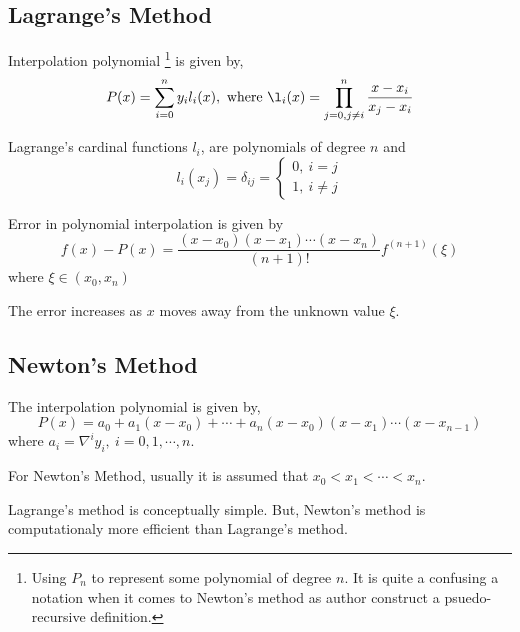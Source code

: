 \subsection{Lagrange's Method}
Interpolation polynomial
\footnote{
	Using $P_n$ to represent some polynomial of degree $n$.
	It is quite a confusing a notation when it comes to Newton's method as author construct a psuedo-recursive definition.
	}
	is given by,
\begin{equation}
	P(x) = \sum_{i=0}^n y_i l_i(x),\text{ where } \l_i(x) = \prod_{j = 0,j \ne i}^n \frac{x-x_i}{x_j-x_i}
	\label{equ:lagrange}
\end{equation}
\begin{remark}
	Lagrange's cardinal functions $l_i$, are polynomials of degree $n$ and
	$$l_i(x_j) = \delta_{ij} = \begin{cases} 0,\ i = j \\ 1,\ i \ne j \end{cases}$$
\end{remark}
\begin{proposition}
	Error in polynomial interpolation is given by
	\begin{equation}
		f(x) - P(x) = \frac{(x-x_0)(x-x_1)\cdots(x-x_n)}{(n+1)!} f^{(n+1)}(\xi)
		\label{equ:error}
	\end{equation}
	where $\xi \in (x_0, x_n)$
\end{proposition}
\begin{remark}
	The error increases as $x$ moves away from the unknown value $\xi$.
\end{remark}

\subsection{Newton's Method}
The interpolation polynomial is given by,
\begin{equation}
	P(x) = a_0 + a_1(x-x_0) + \cdots + a_n(x-x_0)(x-x_1)\cdots(x-x_{n-1})
	\label{equ:newton}
\end{equation}
where $a_i = \nabla^i y_i,\ i = 0,1,\cdots,n$.
\begin{remark}
	For Newton's Method, usually it is assumed that $x_0 < x_1 < \cdots < x_n$.
\end{remark}
\begin{remark}
	 Lagrange's method is conceptually simple.
	 But, Newton's method is computationaly more efficient than Lagrange's method.
\end{remark}

